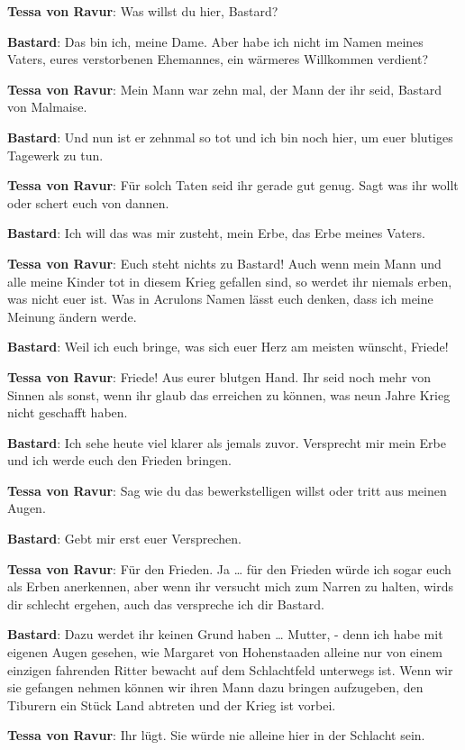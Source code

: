 \documentclass[a5paper,6pt]{book}
\begin{document}
\textbf{Tessa von Ravur}: Was willst du hier, Bastard?

\textbf{Bastard}: Das bin ich, meine Dame. Aber habe ich nicht im Namen meines Vaters, eures verstorbenen Ehemannes, ein wärmeres Willkommen verdient?

\textbf{Tessa von Ravur}: Mein Mann war zehn mal, der Mann der ihr seid, Bastard von Malmaise.

\textbf{Bastard}: Und nun ist er zehnmal so tot und ich bin noch hier, um euer blutiges Tagewerk zu tun.

\textbf{Tessa von Ravur}: Für solch Taten seid ihr gerade gut genug. Sagt was ihr wollt oder schert euch von dannen.

\textbf{Bastard}: Ich will das was mir zusteht, mein Erbe, das Erbe meines Vaters.

\textbf{Tessa von Ravur}: Euch steht nichts zu Bastard! Auch wenn mein Mann und alle meine Kinder tot in diesem Krieg gefallen sind, so werdet ihr niemals erben, was nicht euer ist. Was in Acrulons Namen lässt euch denken, dass ich meine Meinung ändern werde.

\textbf{Bastard}: Weil ich euch bringe, was sich euer Herz am meisten wünscht, Friede!

\textbf{Tessa von Ravur}: Friede! Aus eurer blutgen Hand. Ihr seid noch mehr von Sinnen als sonst, wenn ihr glaub das erreichen zu können, was neun Jahre Krieg nicht geschafft haben.

\textbf{Bastard}: Ich sehe heute viel klarer als jemals zuvor. Versprecht mir mein Erbe und ich werde euch den Frieden bringen.

\textbf{Tessa von Ravur}: Sag wie du das bewerkstelligen willst oder tritt aus meinen Augen.

\textbf{Bastard}: Gebt mir erst euer Versprechen.

\textbf{Tessa von Ravur}: Für den Frieden. Ja … für den Frieden würde ich sogar euch als Erben anerkennen, aber wenn ihr versucht mich zum Narren zu halten, wirds dir schlecht ergehen, auch das verspreche ich dir Bastard.

\textbf{Bastard}: Dazu werdet ihr keinen Grund haben … Mutter, - denn ich habe mit eigenen Augen gesehen, wie Margaret von Hohenstaaden alleine nur von einem einzigen fahrenden Ritter bewacht auf dem Schlachtfeld unterwegs ist. Wenn wir sie gefangen nehmen können wir ihren Mann dazu bringen aufzugeben, den Tiburern ein Stück Land abtreten und der Krieg ist vorbei.

\textbf{Tessa von Ravur}: Ihr lügt. Sie würde nie alleine hier in der Schlacht sein.
\end{document}
